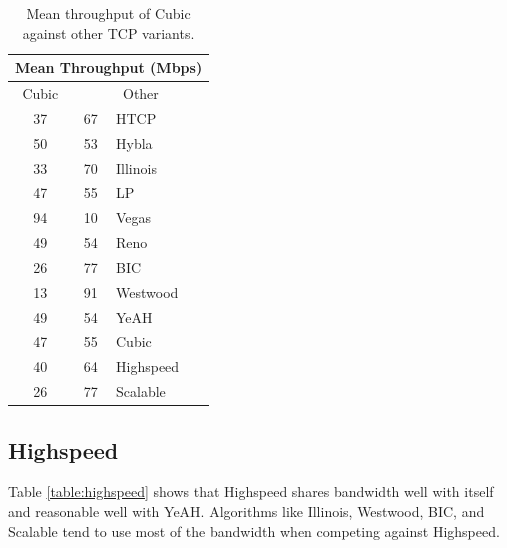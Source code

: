 \documentclass[11pt,a4paper,twocolumn]{article}
\begin{document}
\begin{table}[h!]
	\begin{center}
		\begin{tabular}{| c | c | l |}
    			\hline
			\multicolumn{3}{|c|}{Mean Throughput (Mbps)} \\
    			\hline
    			Cubic &  \multicolumn{2}{|c|}{Other}  \\
			\hline
    			37 & 67 & HTCP \\
			\hline
    			50 & 53 & Hybla \\
			\hline
    			33 & 70 & Illinois \\
			\hline
    			47 & 55 & LP \\
			\hline
    			94 & 10 & Vegas \\
			\hline
    			49 & 54 & Reno \\
			\hline
    			26 & 77 & BIC \\
			\hline
    			13 & 91 & Westwood \\
			\hline
    			49 & 54 & YeAH \\
			\hline
    			47 & 55 & Cubic \\
			\hline
    			40 & 64 & Highspeed \\
			\hline
    			26 & 77 & Scalable \\
    			\hline
    		\end{tabular}
  	\end{center}
  	\caption{Mean throughput of Cubic against other TCP variants.}
	\label{table:cubic}
\end{table}

\subsection{Highspeed}
\label{subsec:highspeed}
Table \ref{table:highspeed} shows that Highspeed shares bandwidth well with itself and reasonable well with
YeAH. Algorithms like Illinois, Westwood, BIC, and Scalable tend to use most of the bandwidth when
competing against Highspeed.
\end{document}
